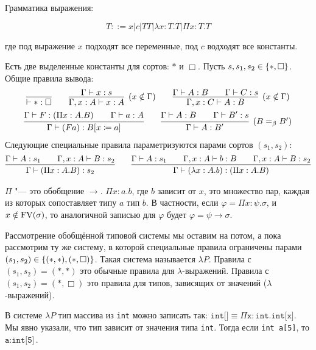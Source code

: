 \begin{definition}
Грамматика выражения:
\begin{bnf}
\[
    T ::= x | c | T T | \lambda x : T . T | \Pi x : T . T
\]
\end{bnf}%
где под выражение $x$ подходят все переменные, под $c$ водходят все константы.

Есть две выделенные константы для сортов: $*$ и $\Box$.
Пусть $s, s_1, s_2 \in \left\{*, \Box\right\}$. Общие правила вывода:
\inferspacing
\begin{gather*}
    \infer{\vdash * : \Box}{} \qquad
    \infer[(x \notin \Gamma)]{\Gamma, x : A \vdash x : A}{\Gamma \vdash x : s} \qquad
    \infer[(x \notin \Gamma)]{\Gamma, x : C \vdash A : B}{\Gamma \vdash A : B && \Gamma \vdash C : s} \\
    \infer{\Gamma \vdash (Fa) : B [x \coloneqq a]}{\Gamma \vdash F : \left(\Pi x : A . B\right) && \Gamma \vdash a : A} \qquad
    \infer[(B =_\beta B')]{\Gamma \vdash A : B'}{\Gamma \vdash A : B \vphantom{(} && \Gamma \vdash B' : s} %
\end{gather*}%
Следующие специальные правила параметризуются парами сортов $(s_1, s_2)$:
\begin{gather*}
    \infer{\Gamma \vdash (\Pi x : A . B) : s_2}{\Gamma \vdash A : s_1 && \Gamma, x : A \vdash B : s_2} \qquad
    \infer{\Gamma \vdash (\lambda x : A . b) : (\Pi x : A . B)}
            {\Gamma \vdash A : s_1 && \Gamma, x : A \vdash b : B && \Gamma, x : A \vdash B : s_2}
\end{gather*}
\end{definition}

$\Pi$ "--- это обобщение $\rightarrow$. $\Pi x : a . b$, где $b$ зависит от $x$, это множество пар,
каждая из которых сопоставляет типу $a$ тип $b$.
В частности, если $\varphi = \Pi x : \psi . \sigma$, и $x \notin \operatorname{FV}(\sigma)$,
то аналогичной записью для $\varphi$ будет $\varphi = \psi \rightarrow \sigma$.

Рассмотрение обобщённой типовой системы мы оставим на потом, а пока рассмотрим ту же систему,
в которой специальные правила ограничены парами $(s_1, s_2) \in \left\{(*, *), (*, \Box)\right\}$.
Такая система называется $\lambda P$.
Правила с $(s_1, s_2) = (*, *)$ это обычные правила для $\lambda$-выражений.
Правила с $(s_1, s_2) = (*, \Box)$ это правила для типов, зависящих от значений ($\lambda$-выражений).

В системе $\lambda P$ тип массива из \texttt{int} можно записать так:
$\texttt{int[]} \equiv \Pi \texttt{x} : \texttt{int}.\texttt{int[x]}$.
Мы явно указали, что тип зависит от значения типа \texttt{int}.
Тогда если \texttt{int a[5]}, то $\texttt{a}:\texttt{int[5]}$.

